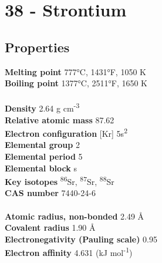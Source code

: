 \section{38 - Strontium}
\label{sec:elem-strontium}
\subsection{Properties}
\textbf{Melting point} 777°C, 1431°F, 1050 K\\
\textbf{Boiling point} 1377°C, 2511°F, 1650 K\\
\\
\textbf{Density} 2.64 g cm\textsuperscript{-3}\\
\textbf{Relative atomic mass} 87.62\\
\textbf{Electron configuration} [Kr] 5s\textsuperscript{2}\\
\textbf{Elemental group} 2\\
\textbf{Elemental period} 5\\
\textbf{Elemental block} s\\
\textbf{Key isotopes} \textsuperscript{86}Sr, \textsuperscript{87}Sr, \textsuperscript{88}Sr \\
\textbf{CAS number} 7440-24-6\\
\\
\textbf{Atomic radius, non-bonded} 2.49 Å\\
\textbf{Covalent radius} 1.90 Å\\
\textbf{Electronegativity (Pauling scale)} 0.95\\
\textbf{Electron affinity} 4.631 (kJ mol\textsuperscript{-1})\\